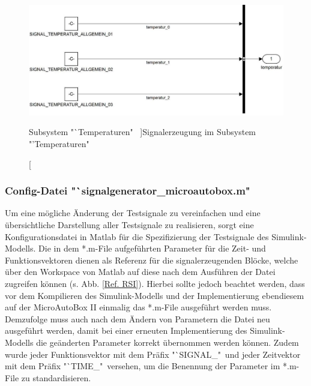 \documentclass[fontsize = 12pt, paper = a4]{scrreprt}
\begin{document}
\newpage

  
\begin{figure}[h]
\centering
\includegraphics[scale = 0.65]{subsubtemp}
\caption[Subsystem "`Temperaturen" \ ]{Signalerzeugung im Subsystem "'Temperaturen" \ }
\label{Signalerzeugung_temp}
\end{figure}

\subsubsection{Config-Datei "`signalgenerator\_microautobox.m" }

Um eine mögliche Änderung der Testsignale zu vereinfachen und eine übersichtliche Darstellung aller Testsignale zu realisieren, sorgt eine Konfigurationsdatei in Matlab für die Spezifizierung der Testsignale des Simulink-Modells. Die in dem *.m-File aufgeführten Parameter für die Zeit- und Funktionsvektoren dienen als Referenz für die signalerzeugenden Blöcke, welche über den Workspace von Matlab auf diese nach dem Ausführen der Datei zugreifen können (s. Abb. \ref{Ref. RSI}). Hierbei sollte jedoch beachtet werden, dass vor dem Kompilieren des Simulink-Modells und der Implementierung ebendiesem auf der MicroAutoBox II einmalig das *.m-File ausgeführt werden muss. Demzufolge muss auch nach dem Ändern von Parametern die Datei neu ausgeführt werden, damit bei einer erneuten Implementierung des Simulink-Modells die geänderten Parameter korrekt übernommen werden können. Zudem wurde jeder Funktionsvektor mit dem Präfix "`SIGNAL\_"\ und jeder Zeitvektor mit dem Präfix "`TIME\_"\ versehen, um die Benennung der Parameter im *.m-File zu standardisieren. \\
\end{document}
